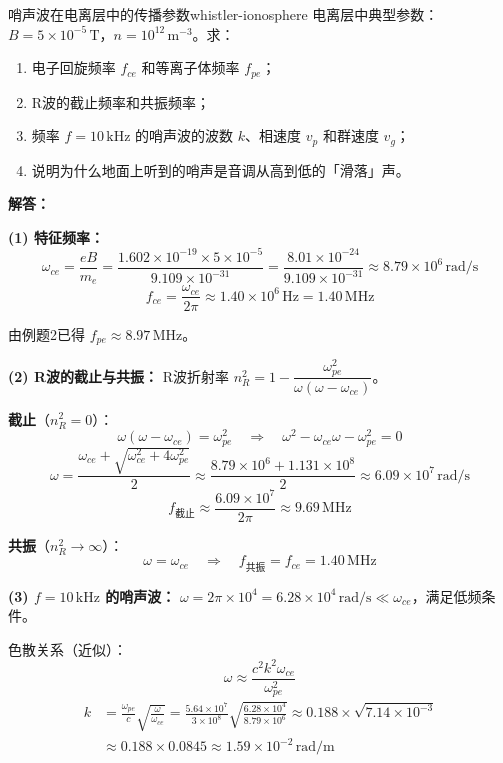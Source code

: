 \begin{example}{哨声波在电离层中的传播参数}{whistler-ionosphere}
电离层中典型参数：$B=5\times 10^{-5}\,\mathrm{T}$，$n=10^{12}\,\mathrm{m}^{-3}$。求：
\begin{enumerate}[label=(\arabic*)]
\item 电子回旋频率 $f_{ce}$ 和等离子体频率 $f_{pe}$；
\item R波的截止频率和共振频率；
\item 频率 $f=10\,\mathrm{kHz}$ 的哨声波的波数 $k$、相速度 $v_p$ 和群速度 $v_g$；
\item 说明为什么地面上听到的哨声是音调从高到低的「滑落」声。
\end{enumerate}
\tcblower
\textbf{解答：}

\textbf{(1) 特征频率：}
\[
\omega_{ce} = \frac{eB}{m_e} = \frac{1.602\times 10^{-19}\times 5\times 10^{-5}}{9.109\times 10^{-31}} = \frac{8.01\times 10^{-24}}{9.109\times 10^{-31}} \approx 8.79\times 10^6\,\mathrm{rad/s}
\]
\[
f_{ce} = \frac{\omega_{ce}}{2\pi} \approx 1.40\times 10^6\,\mathrm{Hz} = 1.40\,\mathrm{MHz}
\]

由例题2已得 $f_{pe} \approx 8.97\,\mathrm{MHz}$。

\textbf{(2) R波的截止与共振：}
R波折射率 $n_R^2 = 1 - \dfrac{\omega_{pe}^2}{\omega(\omega - \omega_{ce})}$。

\textbf{截止}（$n_R^2 = 0$）：
\[
\omega(\omega - \omega_{ce}) = \omega_{pe}^2 \quad\Rightarrow\quad \omega^2 - \omega_{ce}\omega - \omega_{pe}^2 = 0
\]
\[
\omega = \frac{\omega_{ce} + \sqrt{\omega_{ce}^2 + 4\omega_{pe}^2}}{2} \approx \frac{8.79\times 10^6 + 1.131\times 10^8}{2} \approx 6.09\times 10^7\,\mathrm{rad/s}
\]
\[
f_{\text{截止}} \approx \frac{6.09\times 10^7}{2\pi} \approx 9.69\,\mathrm{MHz}
\]

\textbf{共振}（$n_R^2 \to \infty$）：
\[
\omega = \omega_{ce} \quad\Rightarrow\quad f_{\text{共振}} = f_{ce} = 1.40\,\mathrm{MHz}
\]

\textbf{(3) $f=10\,\mathrm{kHz}$ 的哨声波：}
$\omega = 2\pi\times 10^4 = 6.28\times 10^4\,\mathrm{rad/s} \ll \omega_{ce}$，满足低频条件。

色散关系（近似）：
\[
\omega \approx \frac{c^2 k^2 \omega_{ce}}{\omega_{pe}^2}
\]
\[
\begin{aligned}
k &= \frac{\omega_{pe}}{c}\sqrt{\frac{\omega}{\omega_{ce}}} = \frac{5.64\times 10^7}{3\times 10^8}\sqrt{\frac{6.28\times 10^4}{8.79\times 10^6}} \approx 0.188\times\sqrt{7.14\times 10^{-3}}\\
&\approx 0.188\times 0.0845 \approx 1.59\times 10^{-2}\,\mathrm{rad/m}
\end{aligned}
\]


\end{example}
